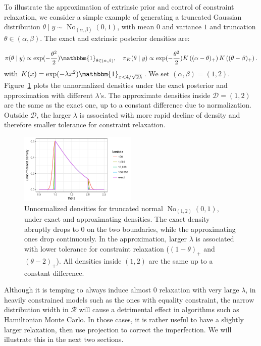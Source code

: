 \documentclass[10pt]{article}
\newcommand{\mc}[1]{\mathcal{#1}}
\DeclareMathOperator{\No}{No}
\begin{document}
To illustrate the approximation of extrinsic prior and control of constraint relaxation, we consider a simple example of generating a truncated Gaussian distribution $\theta \mid y \sim \No_{(\alpha,\beta)}(0,1)$, with mean $0$ and variance $1$ and truncation $\theta\in (\alpha,\beta)$. The exact and extrinsic posterior densities are:

$$\pi(\theta\mid y)\propto \exp(-\frac{\theta^2}{2}) \mathbbm{1}_{\theta\in(\alpha,\beta)}, \quad \pi_K(\theta\mid y)\propto \exp(-\frac{\theta^2}{2}) K \left ( (\alpha - \theta)_+ \right) K \left ( ( \theta - \beta)_+ \right).$$
with $K(x)= \exp( - \lambda x^2)\mathbbm{1}_{x<4/\sqrt{2\lambda}}$. We set $(\alpha, \beta)=(1,2)$. Figure~\ref{truncated_normal} plots the unnormalized densities under the exact posterior and approximation with different $\lambda$'s. The approximate densities inside $\mc D = (1,2)$ are the same as the exact one, up to a constant difference due to normalization. Outside $\mc D$, the larger $\lambda$ is associated with more rapid decline of density and therefore smaller tolerance for constraint relaxation.

\begin{figure}[H]
 \centering
 \includegraphics[width=0.5\textwidth]{density_truncated_normal}
\caption{Unnormalized densities for truncated normal $\No_{(1,2)}(0,1)$, under exact and approximating densities. The exact density abruptly drops to $0$ on the two boundaries, while the approximating ones drop continuously. In the approximation, larger $\lambda$ is associated with lower tolerance for constraint relaxation ($( 1-\theta )_+$ and $( \theta - 2)_+$). All densities inside $(1,2)$ are the same up to a constant difference.}
\label{truncated_normal}
\end{figure}

Although it is temping to always induce almost $0$ relaxation with very large $\lambda$, in heavily constrained models such as the ones with equality constraint, the narrow distribution width in $\mc R$ will cause a detrimental effect in algorithms such as Hamiltonian Monte Carlo. In those cases, it is rather useful to have a slightly larger relaxation, then use projection to correct the imperfection. We will illustrate this in the next two sections.
\end{document}
